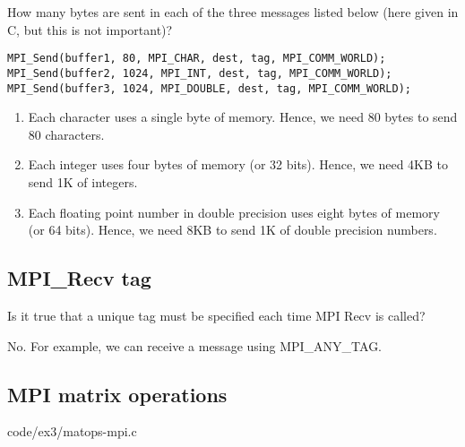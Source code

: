\begin{question}
  How many bytes are sent in each of the three messages listed below (here given in C, but this is not important)?
  \begin{lstlisting}
MPI_Send(buffer1, 80, MPI_CHAR, dest, tag, MPI_COMM_WORLD);
MPI_Send(buffer2, 1024, MPI_INT, dest, tag, MPI_COMM_WORLD);
MPI_Send(buffer3, 1024, MPI_DOUBLE, dest, tag, MPI_COMM_WORLD);
  \end{lstlisting}
\end{question}

\begin{enumerate}
  \item Each character uses a single byte of memory. Hence, we need 80 bytes to send 80 characters.
  \item Each integer uses four bytes of memory (or 32 bits). Hence, we need 4KB to send 1K of integers.
  \item Each floating point number in double precision uses eight bytes of memory (or 64 bits). Hence, we need 8KB to send 1K of double precision numbers.
\end{enumerate}


\subsection{MPI\_Recv tag} %
\label{sub:mpi_recv_tag}

\begin{question}
  Is it true that a unique tag must be specified each time MPI Recv is called?
\end{question}

No. For example, we can receive a message using MPI\_ANY\_TAG.

\subsection{MPI matrix operations} %
\label{sub:mpi_matrix_operations}


  {code/ex3/matops-mpi.c}



